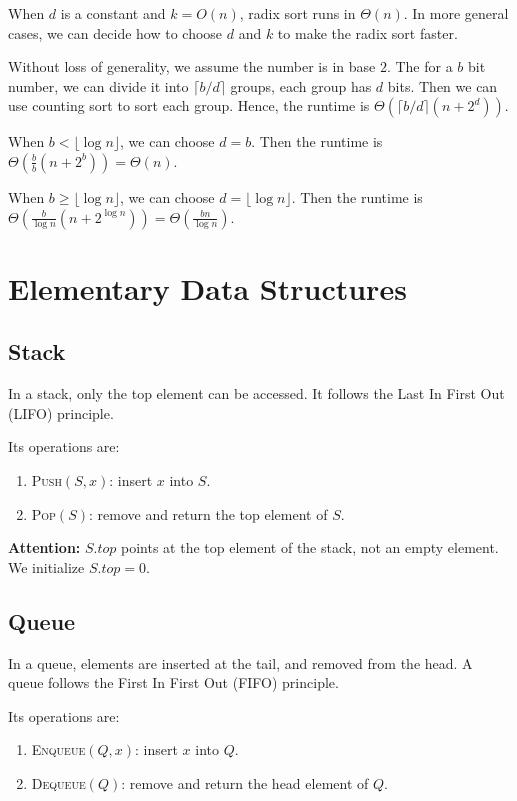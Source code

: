 \documentclass[a4paper,12pt]{article}
\begin{document}
When $d$ is a constant and $k = O(n)$, radix sort runs in $\Theta(n)$.
In more general cases, we can decide how to choose $d$ and $k$ to make the radix sort faster.

Without loss of generality, we assume the number is in base $2$.
The for a $b$ bit number, we can divide it into $\lceil b / d \rceil$ groups, each group has $d$ bits.
Then we can use counting sort to sort each group.
Hence, the runtime is $\Theta(\lceil b / d \rceil (n + 2^d))$.

When $b < \lfloor \log n \rfloor$, we can choose $d = b$.
Then the runtime is $\Theta(\frac{b}{b} (n + 2^b)) = \Theta(n)$.

When $b \geq \lfloor \log n \rfloor$, we can choose $d = \lfloor \log n \rfloor$.
Then the runtime is $\Theta(\frac{b}{\log n} (n + 2^{\log n})) = \Theta(\frac{bn}{\log n})$.


\section{Elementary Data Structures}

\subsection{Stack}

In a stack, only the top element can be accessed.
It follows the Last In First Out (LIFO) principle.

Its operations are:
\begin{enumerate}
	\item \textsc{Push}$(S, x)$: insert $x$ into $S$.
	\item \textsc{Pop}$(S)$: remove and return the top element of $S$.
\end{enumerate}

\textbf{Attention:} 
$S.top$ points at the top element of the stack, not an empty element.
We initialize $S.top = 0$.

\subsection{Queue}

In a queue, elements are inserted at the tail, and removed from the head.
A queue follows the First In First Out (FIFO) principle.

Its operations are:
\begin{enumerate}
	\item \textsc{Enqueue}$(Q, x)$: insert $x$ into $Q$.
	\item \textsc{Dequeue}$(Q)$: remove and return the head element of $Q$.
\end{enumerate}
\end{document}
